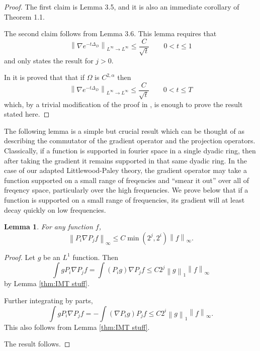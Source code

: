 \documentclass[11pt]{amsart}
\newtheorem{lemma}[theorem]{Lemma}
\theoremstyle{remark}
\theoremstyle{definition}
\newcommand{\norm}[1]{\left\lVert#1\right\rVert}
\newcommand{\grad}{\nabla}
\newcommand{\Laplace}{\Delta}
\begin{document}
\begin{proof}
The first claim is \cite{IMTb} Lemma 3.5, and it is also an immediate corollary of \cite{IMTs} Theorem 1.1.  

The second claim follows from \cite{IMTb} Lemma 3.6.  This lemma requires that
\[ \norm{\grad e^{-t\Laplace_D}}_{L^\infty \to L^\infty} \leq \frac{C}{\sqrt{t}} \qquad 0 < t \leq 1 \]
and only states the result for $j > 0$.  

In \cite{FMP} it is proved that that if $\Omega$ is $C^{2,\alpha}$ then
\[ \norm{\grad e^{-t\Laplace_D}}_{L^\infty \to L^\infty} \leq \frac{C}{\sqrt{t}} \qquad 0 < t \leq T \]
which, by a trivial modification of the proof in \cite{IMTb}, is enough to prove the result stated here.  
\end{proof}

The following lemma is a simple but crucial result which can be thought of as describing the commutator of the gradient operator and the projection operators.  Classically, if a function is supported in fourier space in a single dyadic ring, then after taking the gradient it remains supported in that same dyadic ring.  In the case of our adapted Littlewood-Paley theory, the gradient operator may take a function supported on a small range of freqencies and ``smear it out'' over all of freqency space, particularly over the high frequencies.  We prove below that if a function is supported on a small range of frequencies, its gradient will at least decay quickly on low frequencies.  

\begin{lemma} \label{thm:grad and proj}
For any function $f$,
\[ \norm{P_i \grad P_j f}_\infty \leq C \min(2^j,2^i) \norm{f}_\infty. \]
\end{lemma}
\begin{proof}
Let $g$ be an $L^1$ function.  Then
\[ \int g P_i \grad P_j f = \int (P_i g) \grad P_j f \leq C 2^j \norm{g}_1 \norm{f}_\infty \]
by Lemma \ref{thm:IMT stuff}.  

Further integrating by parts,
\[ \int g P_i \grad P_j f = - \int (\grad P_i g) P_j f \leq C 2^i \norm{g}_1 \norm{f}_\infty. \]
This also follows from Lemma \ref{thm:IMT stuff}.  

The result follows.  
\end{proof}
\end{document}
